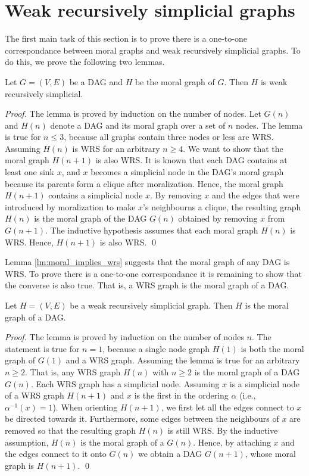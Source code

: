 \section{Weak recursively simplicial graphs}
The first main task of this section is to prove there is a one-to-one correspondance between moral graphs and weak recursively simplicial graphs. To do this, we prove the following two lemmas. 

\begin{lemma}
\label{lm:moral_implies_wrs}
Let $G=(V,E)$ be a DAG and $H$ be the moral graph of $G$. Then $H$ is weak recursively simplicial. 
\end{lemma}

\begin{proof}
The lemma is proved by induction on the number of nodes. Let $G(n)$ and $H(n)$ denote a DAG and its moral graph over a set of $n$ nodes. The lemma is true for $n \le 3$, because all graphs contain three nodes or less are WRS. Assuming $H(n)$ is WRS for an arbitrary $n \ge 4$. We want to show that the moral graph $H(n+1)$ is also WRS. It is known that each DAG contains at least one sink $x$, and $x$ becomes a simplicial node in the DAG's moral graph because its parents form a clique after moralization. Hence, the moral graph $H(n+1)$ contains a simplicial node $x$. By removing $x$ and the edges that were introduced by moralization to make $x$'s neighbourns a clique, the resulting graph $H(n)$ is the moral graph of the DAG $G(n)$ obtained by removing $x$ from $G(n+1)$. The inductive hypothesis assumes that each moral graph $H(n)$ is WRS. Hence, $H(n+1)$ is also WRS. \qed
\end{proof}
Lemma \ref{lm:moral_implies_wrs} suggests that the moral graph of any DAG is WRS. To prove there is a one-to-one correspondance it is remaining to show that the converse is also true. That is, a WRS graph is the moral graph of a DAG. 

\begin{lemma}
\label{lm:wrs_implies_moral}
Let $H=(V,E)$ be a weak recursively simplicial graph. Then $H$ is the moral graph of a DAG. 
\end{lemma}

\begin{proof}
The lemma is proved by induction on the number of nodes $n$. The statement is true for $n=1$, because a single node graph $H(1)$ is both the moral graph of $G(1)$ and a WRS graph. Assuming the lemma is true for an arbitrary $n\ge 2$. That is, any WRS graph $H(n)$ with $n\ge 2$ is the moral graph of a DAG $G(n)$. Each WRS graph has a simplicial node. Assuming $x$ is a simplicial node of a WRS graph $H(n+1)$ and $x$ is the first in the ordering $\alpha$ (i.e., $\alpha^{-1}(x)=1$). When orienting $H(n+1)$, we first let all the edges connect to $x$ be directed towards it. Furthermore, some edges between the neighbours of $x$ are removed so that the resulting graph $H(n)$ is still WRS. By the inductive assumption, $H(n)$ is the moral graph of a $G(n)$. Hence, by attaching $x$ and the edges connect to it onto $G(n)$ we obtain a DAG $G(n+1)$, whose moral graph is $H(n+1)$. \qed
\end{proof}

